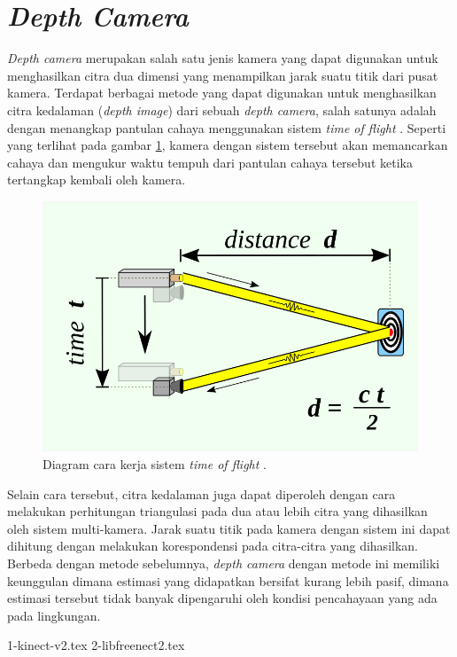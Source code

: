 \section{\emph{Depth Camera}}
\label{sec:depthcamera}

\emph{Depth camera} merupakan salah satu jenis kamera yang dapat digunakan untuk menghasilkan citra dua dimensi yang menampilkan jarak suatu titik dari pusat kamera.
Terdapat berbagai metode yang dapat digunakan untuk menghasilkan citra kedalaman (\emph{depth image}) dari sebuah \emph{depth camera},
  salah satunya adalah dengan menangkap pantulan cahaya menggunakan sistem \emph{time of flight} \citep{cit:idan2001}.
Seperti yang terlihat pada gambar \ref{fig:diagramtimeofflight},
  kamera dengan sistem tersebut akan memancarkan cahaya dan mengukur waktu tempuh dari pantulan cahaya tersebut ketika tertangkap kembali oleh kamera.

\begin{figure}[ht]
  \centering
  \includegraphics[scale=0.25]{gambar/diagram-time-of-flight.png}
  \caption{Diagram cara kerja sistem \emph{time of flight} \citep{url:timeofflight}.}
  \label{fig:diagramtimeofflight}
\end{figure}

Selain cara tersebut,
  citra kedalaman juga dapat diperoleh dengan cara melakukan perhitungan triangulasi pada dua atau lebih citra yang dihasilkan oleh sistem multi-kamera.
Jarak suatu titik pada kamera dengan sistem ini dapat dihitung dengan melakukan korespondensi pada citra-citra yang dihasilkan.
Berbeda dengan metode sebelumnya,
  \emph{depth camera} dengan metode ini memiliki keunggulan dimana estimasi yang didapatkan bersifat kurang lebih pasif,
  dimana estimasi tersebut tidak banyak dipengaruhi oleh kondisi pencahayaan yang ada pada lingkungan.

{1-kinect-v2.tex}
{2-libfreenect2.tex}
